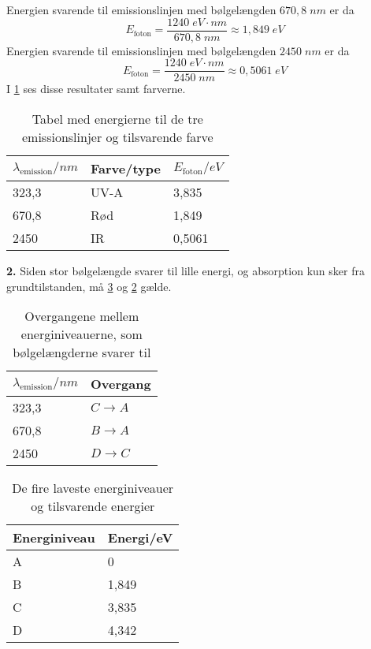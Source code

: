 \documentclass{report}
\begin{document}
Energien svarende til emissionslinjen med bølgelængden $670,8\;\unit{nm} $ er da
\[
E_{\text{foton}}=\frac{1240 \;\unit{eV}\cdot \unit{nm}}{670,8\;\unit{nm} }
\approx 1,849\;\unit{eV} 
\] 
Energien svarende til emissionslinjen med bølgelængden $2450\;\unit{nm} $ er da
\[
E_{\text{foton}}=\frac{1240 \;\unit{eV}\cdot \unit{nm}}{2450\;\unit{nm} }
\approx 0,5061\;\unit{eV} 
\]
I \cref{farve} ses disse resultater samt farverne.
\begin{table}[H]
\centering
\begin{tabular}{@{}lll@{}}
\toprule
$\lambda_{\text{emission}}/\unit{nm}$ & Farve/type & $E_{\text{foton}}/\unit{eV}$ \\ \midrule
323,3                                 & UV-A       & 3,835                        \\
670,8                                 & Rød        & 1,849                        \\
2450                                  & IR         & 0,5061                       \\ \bottomrule
\end{tabular}
\caption{Tabel med energierne til de tre emissionslinjer og tilsvarende farve}
\label{farve}
\end{table}
\noindent \textbf{2.} Siden stor bølgelængde svarer til lille energi, og absorption kun sker fra grundtilstanden, må \cref{energiniveau} og \cref{overgang} gælde.
\begin{table}[H]
\centering
\begin{tabular}{@{}ll@{}}
\toprule
$\lambda_{\text{emission}}/\unit{nm}$ & Overgang         \\ \midrule
323,3                                 & $C\rightarrow A$ \\
670,8                                 & $B\rightarrow A$ \\
2450                                  & $D\rightarrow C$ \\ \bottomrule
\end{tabular}
  \caption{Overgangene mellem energiniveauerne, som bølgelængderne svarer til}
  \label{overgang}
\end{table}
\begin{table}[H]
\centering
\begin{tabular}{@{}ll@{}}
\toprule
Energiniveau & Energi/\unit{eV} \\ \midrule
A            & 0                \\
B            & 1,849            \\
C            & 3,835            \\
D            & 4,342            \\ \bottomrule
\end{tabular}
  \caption{De fire laveste energiniveauer og tilsvarende energier}
  \label{energiniveau}
\end{table}
\end{document}
